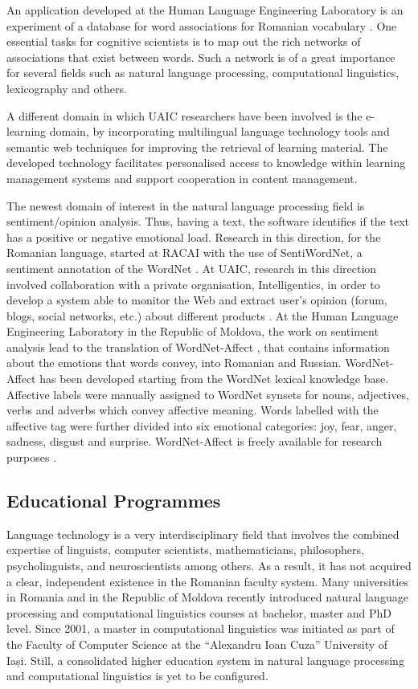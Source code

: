 \begin{multicols}{2}
An application developed at the Human Language Engineering Laboratory is an experiment of a database for word associations for Romanian vocabulary \cite{sem_dict}. One essential tasks for cognitive scientists is to map out the rich networks of associations that exist between words. Such a network is of a great importance for several fields such as natural language processing, computational linguistics, lexicography and others.

A different domain in which UAIC researchers have been involved is the e-learning domain, by incorporating multilingual language technology tools and semantic web techniques for improving the retrieval of learning material. The developed technology facilitates personalised access to knowledge within learning management systems and support cooperation in content management.

The newest domain of interest in the natural language processing field is sentiment/opinion analysis. Thus, having a text, the software identifies if the text has a positive or negative emotional load. Research in this direction, for the Romanian language, started at RACAI with the use of SentiWordNet, a sentiment annotation of the WordNet \cite{sentiwn}. At UAIC, research in this direction involved collaboration with a private organisation, Intelligentics, in order to develop a system able to monitor the Web and extract user’s opinion (forum, blogs, social networks, etc.) about different products \cite{sentimatrix}. At the Human Language Engineering Laboratory in the Republic of Moldova, the work on sentiment analysis lead to the translation of WordNet-Affect \cite{senti_md}, that contains information about the emotions that words convey, into Romanian and Russian. WordNet-Affect has been developed starting from the WordNet lexical knowledge base. Affective labels were manually assigned to WordNet synsets for nouns, adjectives, verbs and adverbs which convey affective meaning. Words labelled with the affective tag were further divided into six emotional categories: joy, fear, anger, sadness, disgust and surprise. WordNet-Affect is freely available for research purposes \cite{wndom}.

\subsection{Educational Programmes}

Language technology is a very interdisciplinary field that involves the combined expertise of linguists, computer scientists, mathematicians, philosophers, psycholinguists, and neuroscientists among others. As a result, it has not acquired a clear, independent existence in the Romanian faculty system. Many universities in Romania and in the Republic of Moldova recently introduced natural language processing and computational linguistics courses at bachelor, master and PhD level. Since 2001, a master in computational linguistics was initiated as part of the Faculty of Computer Science at the “Alexandru Ioan Cuza” University of Iași. Still, a consolidated higher education system in natural language processing and computational linguistics is yet to be configured.


\end{multicols}
